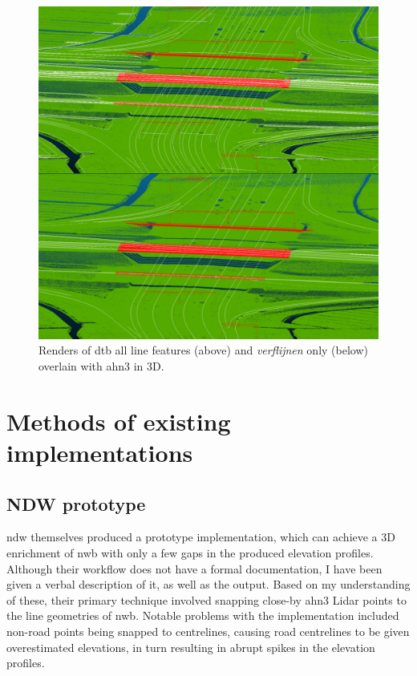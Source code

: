\begin{figure}
    \centering
    \includegraphics[width=0.9\linewidth]{final_report/figs/ahn_sample_10.png} 
    \caption{Renders of \ac{dtb} all line features (above) and \textit{verflijnen} only (below) overlain with \ac{ahn3} in 3D.}
    \label{fig:dtbahn}
\end{figure}

\section{Methods of existing implementations}
\label{sec:methodsexisting}

\subsection{NDW prototype}
\label{sub:ndwprototype}

\ac{ndw} themselves produced a prototype implementation, which can achieve a 3D enrichment of \ac{nwb} with only a few gaps in the produced elevation profiles. Although their workflow does not have a formal documentation, I have been given a verbal description of it, as well as the output. Based on my understanding of these, their primary technique involved snapping close-by \ac{ahn3} Lidar points to the line geometries of \ac{nwb}. Notable problems with the implementation included non-road points being snapped to centrelines, causing road centrelines to be given overestimated elevations, in turn resulting in abrupt spikes in the elevation profiles.

